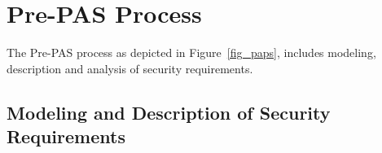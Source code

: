 \section{Pre-PAS Process}
\label{prepas}
The Pre-PAS process as depicted in Figure~\ref{fig_paps}, includes modeling, description and analysis of security requirements. %

\subsection{Modeling and Description of Security Requirements}
\label{prepas_modeling_description}



